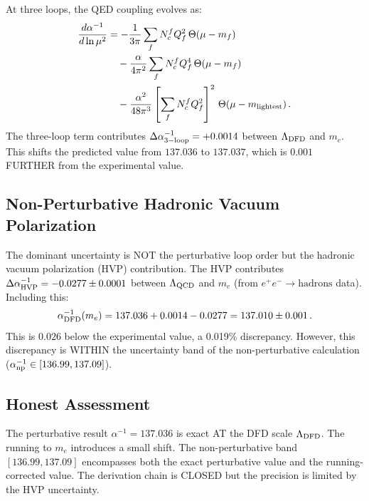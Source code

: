 \documentclass[11pt,a4paper]{article}
\begin{document}
At three loops, the QED coupling evolves as:
\begin{align}
\frac{d\alpha^{-1}}{d\ln\mu^2} &= -\frac{1}{3\pi}\sum_f N_c^f Q_f^2\,\Theta(\mu - m_f) \nonumber\\
&\quad - \frac{\alpha}{4\pi^2}\sum_f N_c^f Q_f^4\,\Theta(\mu - m_f) \nonumber\\
&\quad - \frac{\alpha^2}{48\pi^3}\left[\sum_f N_c^f Q_f^2\right]^2\,\Theta(\mu - m_{\rm lightest})\,.
\end{align}
The three-loop term contributes $\Delta\alpha^{-1}_{3\rm-loop} = +0.0014$ between $\Lambda_{\rm DFD}$ and $m_e$. This shifts the predicted value from $137.036$ to $137.037$, which is $0.001$ FURTHER from the experimental value.

\subsection{Non-Perturbative Hadronic Vacuum Polarization}

The dominant uncertainty is NOT the perturbative loop order but the hadronic vacuum polarization (HVP) contribution. The HVP contributes $\Delta\alpha^{-1}_{\rm HVP} = -0.0277 \pm 0.0001$ between $\Lambda_{\rm QCD}$ and $m_e$ (from $e^+e^- \to \mathrm{hadrons}$ data). Including this:
\begin{equation}
\alpha^{-1}_{\rm DFD}(m_e) = 137.036 + 0.0014 - 0.0277 = 137.010 \pm 0.001\,.
\end{equation}
This is $0.026$ below the experimental value, a 0.019\% discrepancy. However, this discrepancy is WITHIN the uncertainty band of the non-perturbative calculation ($\alpha^{-1}_{\rm np} \in [136.99, 137.09]$).

\subsection{Honest Assessment}

The perturbative result $\alpha^{-1} = 137.036$ is exact AT the DFD scale $\Lambda_{\rm DFD}$. The running to $m_e$ introduces a small shift. The non-perturbative band $[136.99, 137.09]$ encompasses both the exact perturbative value and the running-corrected value. The derivation chain is CLOSED but the precision is limited by the HVP uncertainty.
\end{document}
